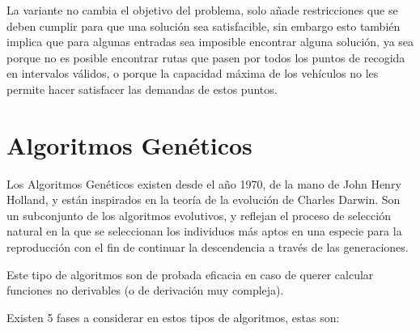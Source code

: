 \documentclass[12pt]{llncs}
\begin{document}
La variante no cambia el objetivo del problema, solo añade restricciones que se deben cumplir para que una solución sea satisfacible, sin embargo esto también implica que para algunas entradas sea imposible encontrar alguna solución, ya sea porque no es posible encontrar rutas que pasen por todos los puntos de recogida en intervalos válidos, o porque la capacidad máxima de los vehículos no les permite hacer satisfacer las demandas de estos puntos.

\section*{Algoritmos Genéticos \cite{ga_kiwi}} 

Los Algoritmos Genéticos existen desde el año 1970, de la mano de John Henry Holland, y están inspirados en la teoría de la evolución de Charles Darwin. Son un subconjunto de los algoritmos evolutivos, y reflejan el proceso de selección natural en la que se seleccionan los individuos más aptos en una especie para la reproducción con el fin de continuar la descendencia a través de las generaciones.

Este tipo de algoritmos son de probada eficacia en caso de querer calcular funciones no derivables (o de derivación muy compleja).

Existen 5 fases a considerar en estos tipos de algoritmos, estas son:
\end{document}

